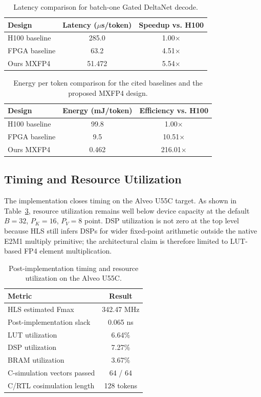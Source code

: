 \documentclass[conference]{IEEEtran}
\begin{document}
\begin{table}[t]
\centering
\caption{Latency comparison for batch-one Gated DeltaNet decode.}
\label{tab:latency_results}
\footnotesize
\begin{tabularx}{\linewidth}{Xcc}
\toprule
Design & Latency ($\mu$s/token) & Speedup vs. H100 \\
\midrule
H100 baseline & 285.0 & 1.00$\times$ \\
FPGA baseline & 63.2 & 4.51$\times$ \\
Ours MXFP4 & 51.472 & 5.54$\times$ \\
\bottomrule
\end{tabularx}
\end{table}

\begin{table}[t]
\centering
\caption{Energy per token comparison for the cited baselines and the proposed MXFP4 design.}
\label{tab:energy_results}
\footnotesize
\begin{tabularx}{\linewidth}{Xcc}
\toprule
Design & Energy (mJ/token) & Efficiency vs. H100 \\
\midrule
H100 baseline & 99.8 & 1.00$\times$ \\
FPGA baseline & 9.5 & 10.51$\times$ \\
Ours MXFP4 & 0.462 & 216.01$\times$ \\
\bottomrule
\end{tabularx}
\end{table}

\subsection{Timing and Resource Utilization}
The implementation closes timing on the Alveo U55C target. As shown in Table~\ref{tab:resource_results}, resource utilization remains well below device capacity at the default $B=32$, $P_K=16$, $P_V=8$ point. DSP utilization is not zero at the top level because HLS still infers DSPs for wider fixed-point arithmetic outside the native E2M1 multiply primitive; the architectural claim is therefore limited to LUT-based FP4 element multiplication.

\begin{table}[t]
\centering
\caption{Post-implementation timing and resource utilization on the Alveo U55C.}
\label{tab:resource_results}
\footnotesize
\begin{tabularx}{\linewidth}{Xc}
\toprule
Metric & Result \\
\midrule
HLS estimated Fmax & 342.47 MHz \\
Post-implementation slack & 0.065 ns \\
LUT utilization & 6.64\% \\
DSP utilization & 7.27\% \\
BRAM utilization & 3.67\% \\
C-simulation vectors passed & 64 / 64 \\
C/RTL cosimulation length & 128 tokens \\
\bottomrule
\end{tabularx}
\end{table}
\end{document}
